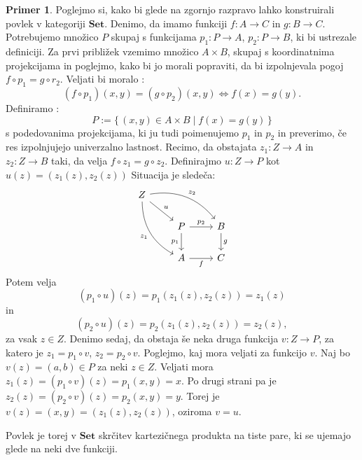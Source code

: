\documentclass[12pt,a4paper]{book}
\theoremstyle{definition}
\theoremstyle{plain}
\theoremstyle{definition}
\newtheorem{primer}{Primer}[section]
\theoremstyle{remark}
\newcommand{\cat}[1]{\textbf{#1}}
\renewcommand{\set}[1]{\{\,#1\,\}}
\begin{document}
\begin{primer}
Poglejmo si, kako bi glede na zgornjo razpravo lahko konstruirali povlek v kategoriji $\cat{Set}$. Denimo, da imamo funkciji $f : A \to C$ in $g : B \to C$. Potrebujemo množico $P$ skupaj s funkcijama $p_1 : P \to A$, $p_2 : P \to B$, ki bi ustrezale definiciji. Za prvi približek vzemimo množico $A \times B$, skupaj s koordinatnima projekcijama in poglejmo, kako bi jo morali popraviti, da bi izpolnjevala pogoj $f \circ p_1 = g \circ r_2$. Veljati bi moralo :
$$(f \circ p_1)(x,y) = (g \circ p_2)(x,y) \Leftrightarrow f(x) = g(y).$$
Definiramo :
$$P := \set{(x,y) \in A \times B \mid f(x) = g(y)}$$
s podedovanima projekcijama, ki ju tudi poimenujemo $p_1$ in $p_2$ in preverimo, če res izpolnjujejo univerzalno lastnost. Recimo, da obstajata $z_1 : Z \to A$ in $z_2 : Z \to B$ taki, da velja $f \circ z_1 = g \circ z_2$. Definirajmo $u : Z \to P$ kot $u(z) = (z_1(z), z_2(z))$
Situacija je sledeča:
%
$$\begin{tikzcd}
Z
\arrow[drr, bend left, "z_2"]
\ar[dr, "u"]
\arrow[ddr, bend right, "z_1"'] & & \\
& P \arrow[r, "p_2"] \arrow[d, "p_1"']
& B \arrow[d, "g"] \\
& A \arrow[r, "f"']
& C
\end{tikzcd}$$
%
Potem velja 
$$(p_1 \circ u)(z) = p_1(z_1(z),z_2(z)) = z_1(z)$$ 
in 
$$(p_2 \circ u)(z) = p_2(z_1(z),z_2(z)) = z_2(z),$$ 
za vsak $z \in Z$. Denimo sedaj, da obstaja še neka druga funkcija $v : Z \to P$, za katero je $z_1 = p_1 \circ v$, $z_2 = p_2 \circ v$. Poglejmo, kaj mora veljati za funkcijo $v$. Naj bo $v(z) = (a,b) \in P$ za neki $z \in Z$. Veljati mora $z_1(z) = (p_1 \circ v)(z) = p_1(x,y) = x$. Po drugi strani pa je $z_2(z) = (p_2 \circ v)(z) = p_2(x,y) = y$. Torej je $v(z) = (x,y) = (z_1(z),z_2(z))$, oziroma $v = u$.
\end{primer}

Povlek je torej v $\cat{Set}$ skrčitev kartezičnega produkta na tiste pare, ki se ujemajo glede na neki dve funkciji.
\end{document}
